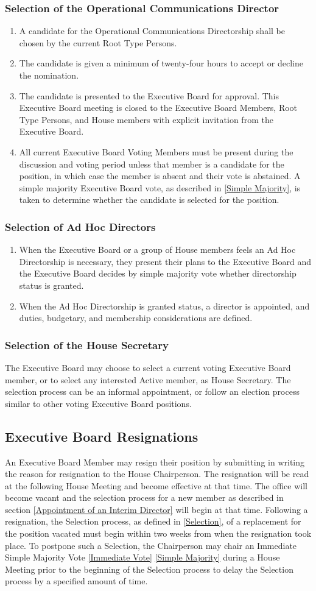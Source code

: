 \documentclass{article}
\newcommand{\asection}[1]{\subsection{#1} \label{#1}}
\newcommand{\asubsection}[1]{\subsubsection{#1} \label{#1}}
\begin{document}
\asubsection{Selection of the Operational Communications Director}
\begin{enumerate}
	\item A candidate for the Operational Communications Directorship shall be chosen by the current Root Type Persons.
	\item The candidate is given a minimum of twenty-four hours to accept or decline the nomination.
	\item The candidate is presented to the Executive Board for approval.
		This Executive Board meeting is closed to the Executive Board Members, Root Type Persons, and House members with explicit invitation from the Executive Board.
	\item All current Executive Board Voting Members must be present during the discussion and voting period unless that member is a candidate for the position, in which case the member is absent and their vote is abstained.
		A simple majority Executive Board vote, as described in \ref{Simple Majority}, is taken to determine whether the candidate is selected for the position.
\end{enumerate}
\asubsection{Selection of Ad Hoc Directors}
\begin{enumerate}
	\item When the Executive Board or a group of House members feels an Ad Hoc Directorship is necessary, they present their plans to the Executive Board and the Executive Board decides by simple majority vote whether directorship status is granted.
	\item When the Ad Hoc Directorship is granted status, a director is appointed, and duties, budgetary, and membership considerations are defined.
\end{enumerate}
\asubsection{Selection of the House Secretary}
The Executive Board may choose to select a current voting Executive Board member, or to select any interested Active member, as House Secretary.
The selection process can be an informal appointment, or follow an election process similar to other voting Executive Board positions.

\asection{Executive Board Resignations}
An Executive Board Member may resign their position by submitting in writing the reason for resignation to the House Chairperson.
The resignation will be read at the following House Meeting and become effective at that time.
The office will become vacant and the selection process for a new member as described in section \ref{Appointment of an Interim Director} will begin at that time.
Following a resignation, the Selection process, as defined in \ref{Selection}, of a replacement for the position vacated must begin within two weeks from when the resignation took place.
To postpone such a Selection, the Chairperson may chair an Immediate Simple Majority Vote \ref{Immediate Vote} \ref{Simple Majority} during a House Meeting prior to the beginning of the Selection process to delay the Selection process by a specified amount of time.
\end{document}
